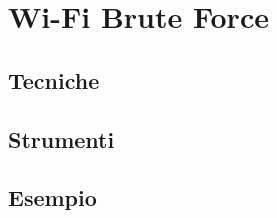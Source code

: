 \chapter{Wi-Fi Brute Force}
\section{Tecniche}
\section{Strumenti}
\section{Esempio}
\label{chap:conc}
